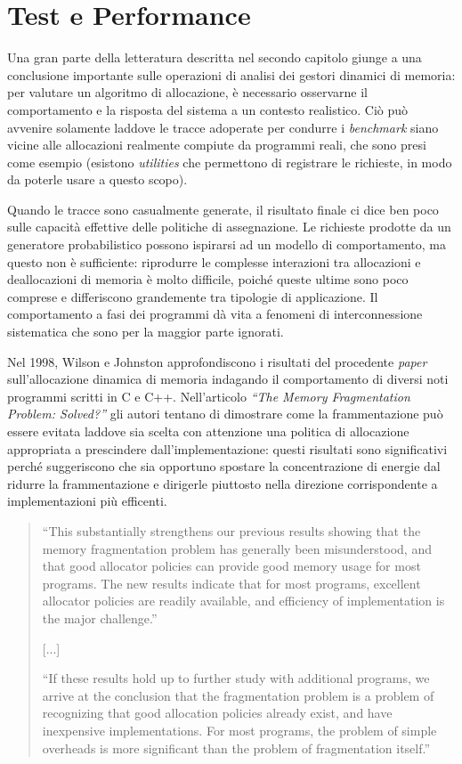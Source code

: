 \chapter[Test e Performance]{Test e Performance}

Una gran parte della letteratura descritta nel secondo capitolo giunge a una conclusione importante sulle operazioni di analisi dei gestori dinamici di memoria: per valutare un algoritmo di allocazione, è necessario osservarne il comportamento e la risposta del sistema a un contesto realistico. Ciò può avvenire solamente laddove le tracce adoperate per condurre i \textit{benchmark} siano vicine alle allocazioni realmente compiute da programmi reali, che sono presi come esempio (esistono \textit{utilities} che permettono di registrare le richieste, in modo da poterle usare a questo scopo).

Quando le tracce sono casualmente generate, il risultato finale ci dice ben poco sulle capacità effettive delle politiche di assegnazione. Le richieste prodotte da un generatore probabilistico possono ispirarsi ad un modello di comportamento, ma questo non è sufficiente: riprodurre le complesse interazioni tra allocazioni e deallocazioni di memoria è molto difficile, poiché queste ultime sono poco comprese e differiscono grandemente tra tipologie di applicazione. Il comportamento a fasi dei programmi dà vita a fenomeni di interconnessione sistematica che sono per la maggior parte ignorati.

Nel 1998, Wilson e Johnston approfondiscono i risultati del procedente \textit{paper} sull’allocazione dinamica di memoria indagando il comportamento di diversi noti programmi scritti in C e C++. Nell’articolo \textit{``The Memory Fragmentation Problem: Solved?''}\cite{wilson1998} gli autori tentano di dimostrare come la frammentazione può essere evitata laddove sia scelta con attenzione una politica di allocazione appropriata a prescindere dall’implementazione: questi risultati sono significativi perché suggeriscono che sia opportuno spostare la concentrazione di energie dal ridurre la frammentazione e dirigerle piuttosto nella direzione corrispondente a implementazioni più efficenti.

\begin{quote}
``This substantially strengthens our previous results showing that the memory fragmentation problem has generally been misunderstood, and that good allocator policies can provide good memory usage for most programs. The new results indicate that for most programs, excellent allocator policies are readily available, and efficiency of implementation is the major challenge.''

\begin{center}
[...]
\end{center}

``If these results hold up to further study with additional programs, we arrive at the conclusion that the fragmentation problem is a problem of recognizing that good allocation policies already exist, and have inexpensive implementations. For most programs, the problem of simple overheads is more significant than the problem of fragmentation itself.''
\end{quote} 

